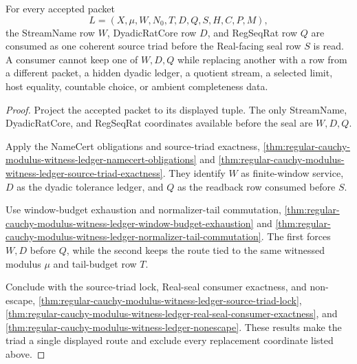 \begin{theorem}
\label{thm:regular-cauchy-modulus-witness-ledger-dyadic-window-coherence}
For every accepted packet
$$
L=(X,\mu,W,N_0,T,D,Q,S,H,C,P,M),
$$
the StreamName row $W$, DyadicRatCore row $D$, and RegSeqRat row $Q$ are consumed as one coherent source triad before the Real-facing seal row $S$ is read. A consumer cannot keep one of $W,D,Q$ while replacing another with a row from a different packet, a hidden dyadic ledger, a quotient stream, a selected limit, host equality, countable choice, or ambient completeness data.
\end{theorem}
\begin{proof}
Project the accepted packet to its displayed tuple. The only StreamName, DyadicRatCore, and RegSeqRat coordinates available before the seal are $W,D,Q$.

Apply the NameCert obligations and source-triad exactness, \autoref{thm:regular-cauchy-modulus-witness-ledger-namecert-obligations} and \autoref{thm:regular-cauchy-modulus-witness-ledger-source-triad-exactness}. They identify $W$ as finite-window service, $D$ as the dyadic tolerance ledger, and $Q$ as the readback row consumed before $S$.

Use window-budget exhaustion and normalizer-tail commutation, \autoref{thm:regular-cauchy-modulus-witness-ledger-window-budget-exhaustion} and \autoref{thm:regular-cauchy-modulus-witness-ledger-normalizer-tail-commutation}. The first forces $W,D$ before $Q$, while the second keeps the route tied to the same witnessed modulus $\mu$ and tail-budget row $T$.

Conclude with the source-triad lock, Real-seal consumer exactness, and non-escape, \autoref{thm:regular-cauchy-modulus-witness-ledger-source-triad-lock}, \autoref{thm:regular-cauchy-modulus-witness-ledger-real-seal-consumer-exactness}, and \autoref{thm:regular-cauchy-modulus-witness-ledger-nonescape}. These results make the triad a single displayed route and exclude every replacement coordinate listed above.
\end{proof}

